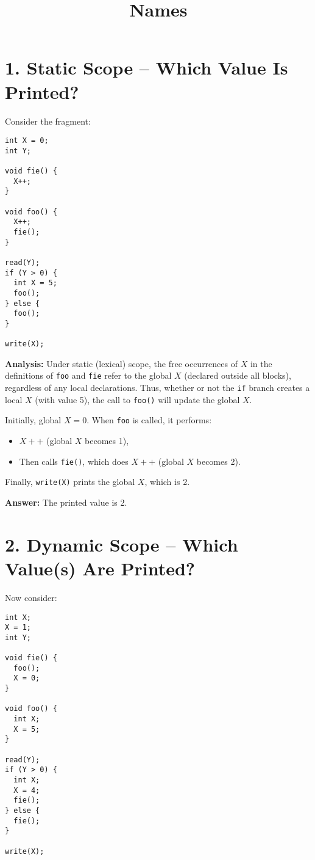 \documentclass[12pt]{article}
\title{Names}
\author{}
\date{}
\begin{document}
\maketitle

\section*{1. Static Scope -- Which Value Is Printed?}
Consider the fragment:
\begin{verbatim}
int X = 0;
int Y;

void fie() {
  X++;
}

void foo() {
  X++;
  fie();
}

read(Y);
if (Y > 0) {
  int X = 5;
  foo();
} else {
  foo();
}

write(X);
\end{verbatim}

\textbf{Analysis:}
Under static (lexical) scope, the free occurrences of \( X \) in the definitions of \texttt{foo} and \texttt{fie} refer to the global \( X \) (declared outside all blocks), regardless of any local declarations. Thus, whether or not the \texttt{if} branch creates a local \( X \) (with value 5), the call to \texttt{foo()} will update the global \( X \).

Initially, global \( X = 0 \). When \texttt{foo} is called, it performs:
\begin{itemize}
  \item \( X++ \) (global \( X \) becomes 1),
  \item Then calls \texttt{fie()}, which does \( X++ \) (global \( X \) becomes 2).
\end{itemize}

Finally, \texttt{write(X)} prints the global \( X \), which is 2.

\textbf{Answer:} The printed value is 2.

\section*{2. Dynamic Scope -- Which Value(s) Are Printed?}
Now consider:
\begin{verbatim}
int X;
X = 1;
int Y;

void fie() {
  foo();
  X = 0;
}

void foo() {
  int X;
  X = 5;
}

read(Y);
if (Y > 0) {
  int X;
  X = 4;
  fie();
} else {
  fie();
}

write(X);
\end{verbatim}
\end{document}
